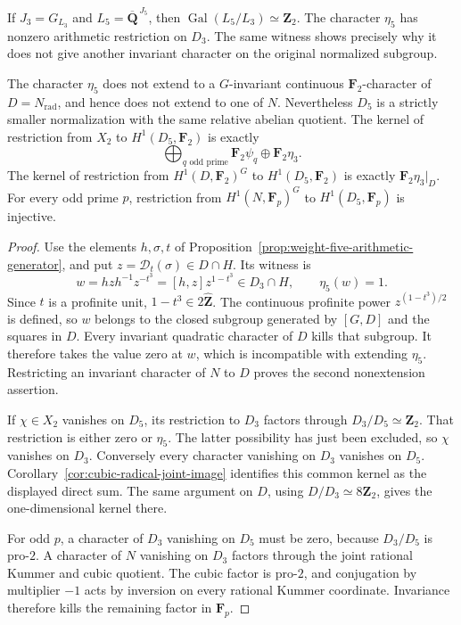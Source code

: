If $J_3=G_{L_3}$ and $L_5=\overline{\mathbf Q}^{\,J_5}$,
then $\operatorname{Gal}(L_5/L_3)\simeq\mathbf Z_2$.
The character $\eta_5$ has nonzero arithmetic restriction on $D_3$.
The same witness shows precisely why it does not give another invariant
character on the original normalized subgroup.

\begin{corollary}\label{cor:weight-five-nonextension}
The character $\eta_5$ does not extend to a $G$-invariant continuous
$\mathbf F_2$-character of $D=N_{\mathrm{rad}}$, and hence does not
extend to one of $N$.  Nevertheless $D_5$ is a strictly smaller
normalization with the same relative abelian quotient.  The kernel of
restriction from $X_2$ to $H^1(D_5,\mathbf F_2)$ is exactly
\[
 \bigoplus_{q\text{ odd prime}}\mathbf F_2\psi_q
       \oplus\mathbf F_2\eta_3.
\]
The kernel of restriction from $H^1(D,\mathbf F_2)^G$ to
$H^1(D_5,\mathbf F_2)$ is exactly $\mathbf F_2\eta_3|_D$.
For every odd prime $p$, restriction from $H^1(N,\mathbf F_p)^G$
to $H^1(D_5,\mathbf F_p)$ is injective.
\end{corollary}

\begin{proof}
Use the elements $h,\sigma,t$ of
Proposition~\ref{prop:weight-five-arithmetic-generator}, and put
$z=\mathcal D_t(\sigma)\in D\cap H$.  Its witness is
\[
 w=hzh^{-1}z^{-t^3}=[h,z]z^{1-t^3}\in D_3\cap H,
 \qquad \eta_5(w)=1.
\]
Since $t$ is a profinite unit, $1-t^3\in2\widehat{\mathbf Z}$.
The continuous profinite power $z^{(1-t^3)/2}$ is defined, so
$w$ belongs to the closed subgroup generated by $[G,D]$ and the
squares in $D$.  Every invariant quadratic character of $D$ kills
that subgroup.  It therefore takes the value zero at $w$, which is
incompatible with extending $\eta_5$.  Restricting an invariant
character of $N$ to $D$ proves the second nonextension assertion.

If $\chi\in X_2$ vanishes on $D_5$, its restriction to $D_3$
factors through $D_3/D_5\simeq\mathbf Z_2$.  That restriction is
either zero or $\eta_5$.  The latter possibility has just been
excluded, so $\chi$ vanishes on $D_3$.  Conversely every character
vanishing on $D_3$ vanishes on $D_5$.  Corollary~\ref{cor:cubic-radical-joint-image}
identifies this common kernel as the displayed direct sum.
The same argument on $D$, using $D/D_3\simeq8\mathbf Z_2$,
gives the one-dimensional kernel there.

For odd $p$, a character of $D_3$ vanishing on $D_5$ must be zero,
because $D_3/D_5$ is pro-$2$.  A character of $N$ vanishing on
$D_3$ factors through the joint rational Kummer and cubic quotient.
The cubic factor is pro-$2$, and conjugation by multiplier $-1$
acts by inversion on every rational Kummer coordinate.  Invariance
therefore kills the remaining factor in $\mathbf F_p$.
\end{proof}

